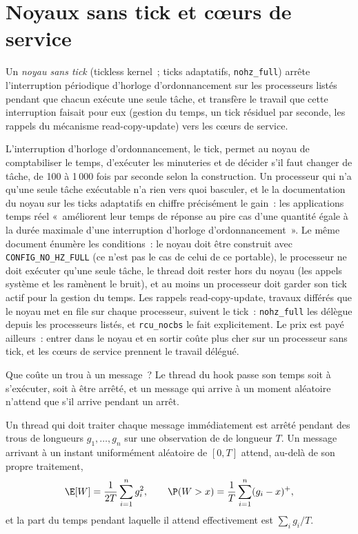 \section{Noyaux sans tick et cœurs de service}

\begin{definition}\label{def:ll:linux-tuning:nohz}
Un \emph{noyau sans tick} (tickless kernel~; ticks adaptatifs, \texttt{nohz\_full}) arrête l'interruption périodique d'horloge
d'ordonnancement sur les processeurs listés pendant que chacun exécute une seule tâche, et transfère le travail que cette interruption faisait pour eux (gestion du temps, un
tick résiduel par seconde, les rappels du mécanisme read-copy-update) vers les cœurs de service.
\end{definition}

L'interruption d'horloge d'ordonnancement, le tick, permet au noyau de comptabiliser le temps, d'exécuter les minuteries et de décider s'il faut changer de tâche,
de 100 à 1\,000 fois par seconde selon la construction. Un processeur qui n'a qu'une seule tâche exécutable n'a rien vers quoi basculer, et le
la documentation du noyau sur les ticks adaptatifs en chiffre précisément le gain~: les applications temps réel «~améliorent leur temps de réponse au pire cas
d'une quantité égale à la durée maximale d'une interruption d'horloge d'ordonnancement~». Le même document énumère les conditions~: le noyau doit être
construit avec \texttt{CONFIG\_NO\_HZ\_FULL} (ce n'est pas le cas de celui de ce portable), le processeur ne doit exécuter qu'une seule tâche, le thread doit rester hors du
noyau (les appels système et les  ramènent le bruit), et au moins un processeur doit garder son tick actif pour la gestion du temps.
Les rappels read-copy-update, travaux différés que le noyau met en file sur chaque processeur, suivent le tick~: \texttt{nohz\_full} les délègue
depuis les processeurs listés, et \texttt{rcu\_nocbs} le fait explicitement. Le prix est payé ailleurs~: entrer dans le noyau et en sortir
coûte plus cher sur un processeur sans tick, et les cœurs de service prennent le travail délégué.

Que coûte un trou à un message~? Le thread du hook passe son temps soit à s'exécuter, soit à être arrêté, et un message qui arrive à un
moment aléatoire n'attend que s'il arrive pendant un arrêt.

\begin{proposition}\label{prop:ll:linux-tuning:wait}
Un thread qui doit traiter chaque message immédiatement est arrêté pendant des trous de longueurs $g_1,\dots,g_n$ sur une observation de
de longueur $T$. Un message arrivant à un instant uniformément aléatoire de $[0,T]$ attend, au-delà de son propre traitement,
\[
\E[W] = \frac{1}{2T}\sum_{i=1}^{n} g_i^2, \qquad \P(W > x) = \frac{1}{T}\sum_{i=1}^{n} (g_i - x)^+ ,
\]
et la part du temps pendant laquelle il attend effectivement est $\sum_i g_i/T$.
\end{proposition}

